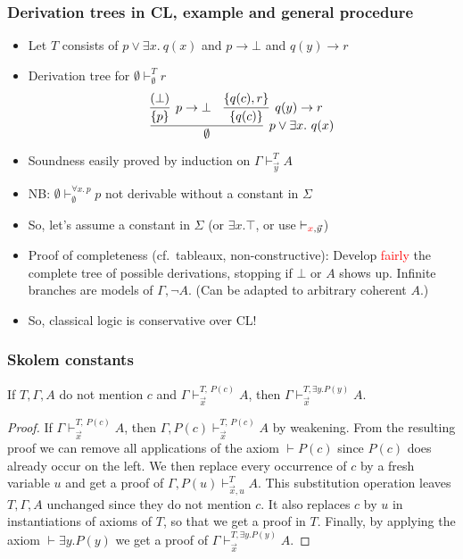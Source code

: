\documentclass[handout,11pt,hyperref ={colorlinks = true, urlcolor = red}]{beamer}
\newcommand{\red}[1]{\textcolor{red}{#1}}
\newcommand{\set}[1]{\{#1\}}
\begin{document}
\begin{frame}\label{proofsearch}
\frametitle{Derivation trees in CL, example and general procedure}
 \begin{itemize}[<+->]   %
    \item Let $T$ consists of $p\lor \exists x.~q(x)$ 
    and $p\to\bot$ and $q(y)\to r$
    \item Derivation tree for $\emptyset\vdash_{\emptyset}^T r$
    \[
\infer[p\vee \exists x.~q(x)]{\emptyset}
{
\infer[p\to\bot]{\set{p}}{(\bot)} & \infer[q(y)\to r]{\set{q(c)}}{\set{q(c),r}}
}
\]
\item Soundness easily proved by induction on $\Gamma\vdash_{\vec{y}}^T A$
    \item NB: $\emptyset\vdash_{\emptyset}^{\forall x.\,p} p$
     not derivable without a constant in $\Sigma$
    \item So, let's assume a constant in $\Sigma$ (or $\exists x.\top$,
    or use $\vdash_{\red{x},\vec{y}}$)
    \item Proof of completeness (cf.\ tableaux, non-constructive):
    Develop \red{fairly} the complete tree of possible derivations,
    stopping if $\bot$ or $A$ shows up. Infinite branches are models 
    of $\Gamma,\neg A$. (Can be adapted to arbitrary coherent $A$.)
    \item So, classical logic is conservative over CL!
 \end{itemize}
\end{frame}

\begin{frame}
\frametitle{Skolem constants}
\begin{theorem}
If $T,\Gamma,A$ do not mention $c$ and $\Gamma\vdash_{\vec{x}}^{T,\,P(c)} A$, then
$\Gamma\vdash_{\vec{x}}^{T,\exists y. P(y)} A$.
\end{theorem}
\begin{proof} 
If $\Gamma\vdash_{\vec{x}}^{T,\,P(c)} A$, 
then $\Gamma,P(c)\vdash_{\vec{x}}^{T,\,P(c)} A$ by weakening.
From the resulting proof we can remove all applications of
the axiom $\vdash P(c)$ since $P(c)$ does already occur on the left. 
We then replace every occurrence of $c$ by a fresh variable $u$ and 
get a proof of $\Gamma,P(u)\vdash_{\vec{x},u}^{T} A$.
This substitution operation leaves $T,\Gamma,A$ unchanged
since they do not mention $c$.
It also replaces $c$ by $u$ in instantiations of axioms of $T$,
so that we get a proof in $T$. Finally,
by applying the axiom $\vdash\exists y. P(y)$
we get a proof of $\Gamma\vdash_{\vec{x}}^{T,\exists y. P(y)} A$.
\end{proof}
\end{frame}
\end{document}
